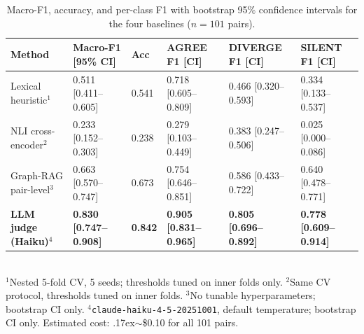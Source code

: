 \documentclass[manuscript]{acmart}
\begin{document}
\begin{table}
  \caption{Macro-F1, accuracy, and per-class F1 with bootstrap 95\% confidence
    intervals for the four baselines ($n = 101$ pairs).}
  \label{tab:results}
  \begin{tabular}{llllll}
    \toprule
    Method & Macro-F1 [95\% CI] & Acc & AGREE F1 [CI] & DIVERGE F1 [CI] & SILENT F1 [CI] \\
    \midrule
    Lexical heuristic$^1$
      & 0.511 [0.411--0.605] & 0.541
      & 0.718 [0.605--0.809] & 0.466 [0.320--0.593] & 0.334 [0.133--0.537] \\
    NLI cross-encoder$^2$
      & 0.233 [0.152--0.303] & 0.238
      & 0.279 [0.103--0.449] & 0.383 [0.247--0.506] & 0.025 [0.000--0.086] \\
    Graph-RAG pair-level$^3$
      & 0.663 [0.570--0.747] & 0.673
      & 0.754 [0.646--0.851] & 0.586 [0.433--0.722] & 0.640 [0.478--0.771] \\
    \textbf{LLM judge (Haiku)}$^4$
      & \textbf{0.830 [0.747--0.908]} & \textbf{0.842}
      & \textbf{0.905 [0.831--0.965]} & \textbf{0.805 [0.696--0.892]}
      & \textbf{0.778 [0.609--0.914]} \\
    \bottomrule
  \end{tabular}
  \smallskip\\
  {\small $^1$Nested 5-fold CV, 5 seeds; thresholds tuned on inner folds only.
  $^2$Same CV protocol, thresholds tuned on inner folds.
  $^3$No tunable hyperparameters; bootstrap CI only.
  $^4$\texttt{claude-haiku-4-5-20251001}, default temperature; bootstrap CI
  only. Estimated cost: {\raise.17ex\hbox{$\scriptstyle\sim$}}\$0.10 for all
  101 pairs.}
\end{table}
\end{document}
